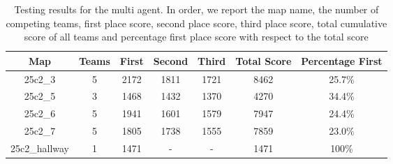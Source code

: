 \begin{table}[h!]
    \centering
    \begin{tabular}{|c|c|c|c|c|c|c|}
        \hline
        Map & Teams & First & Second & Third & Total Score & Percentage First \\
        \hline
        25c2\_3         & 5  & 2172   & 1811  & 1721  & 8462  & 25.7\% \\
        25c2\_5         & 3  & 1468   & 1432  & 1370  & 4270  & 34.4\% \\
        25c2\_6         & 5  & 1941   & 1601  & 1579  & 7947  & 24.4\% \\
        25c2\_7         & 5  & 1805   & 1738  & 1555  & 7859  & 23.0\% \\
        25c2\_hallway   & 1  & 1471   & -     & -     & 1471  & 100\% \\
        \hline
    \end{tabular}
    \caption{Testing results for the multi agent. In order, we report the map name, the number of competing teams, first place score, second place score, third place score, total cumulative score of all teams and percentage first place score with respect to the total score}
    \label{tab:table_2}
\end{table}